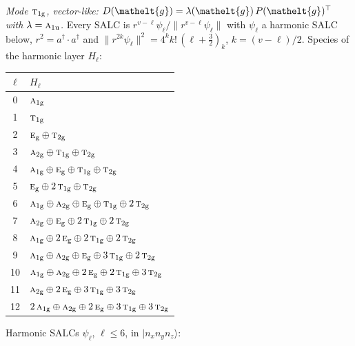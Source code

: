 \documentclass[11pt]{article}
\newcommand{\eltfont}[1]{{\let\sigma\eltsigma\mathelt{#1}}}
\newcommand{\irr}[1]{\text{\normalfont\scshape #1}}
\newcommand{\elt}[1]{\eltfont{#1}}
\newcommand{\ptag}[1]{\mathrm{#1}}
\newcommand{\occ}[1]{\lvert #1\rangle}
\newcommand{\gel}{\elt{g}}             %
\newcommand{\gmat}{P(\gel)^{\top}}     %
\begin{document}
\emph{Mode $\irr{t}_{1\ptag{g}}$, vector-like: $D(\gel)=\lambda(\gel)\,\gmat$ with $\lambda=\irr{a}_{1\ptag{u}}$.} Every SALC is $r^{v-\ell}\psi_\ell/\lVert r^{v-\ell}\psi_\ell\rVert$ with $\psi_\ell$ a harmonic SALC below, $r^2=a^\dagger\!\cdot a^\dagger$ and $\lVert r^{2k}\psi_\ell\rVert^2=4^kk!\,(\ell+\tfrac32)_k$, $k=(v-\ell)/2$. Species of the harmonic layer $H_\ell$:
\begin{longtable}{c l}\hline $\ell$ & $H_\ell$\\ \hline\endhead
0 & $\irr{a}_{1\ptag{g}}$\\
1 & $\irr{t}_{1\ptag{g}}$\\
2 & $\irr{e}_{\ptag{g}}\oplus \irr{t}_{2\ptag{g}}$\\
3 & $\irr{a}_{2\ptag{g}}\oplus \irr{t}_{1\ptag{g}}\oplus \irr{t}_{2\ptag{g}}$\\
4 & $\irr{a}_{1\ptag{g}}\oplus \irr{e}_{\ptag{g}}\oplus \irr{t}_{1\ptag{g}}\oplus \irr{t}_{2\ptag{g}}$\\
5 & $\irr{e}_{\ptag{g}}\oplus 2\,\irr{t}_{1\ptag{g}}\oplus \irr{t}_{2\ptag{g}}$\\
6 & $\irr{a}_{1\ptag{g}}\oplus \irr{a}_{2\ptag{g}}\oplus \irr{e}_{\ptag{g}}\oplus \irr{t}_{1\ptag{g}}\oplus 2\,\irr{t}_{2\ptag{g}}$\\
7 & $\irr{a}_{2\ptag{g}}\oplus \irr{e}_{\ptag{g}}\oplus 2\,\irr{t}_{1\ptag{g}}\oplus 2\,\irr{t}_{2\ptag{g}}$\\
8 & $\irr{a}_{1\ptag{g}}\oplus 2\,\irr{e}_{\ptag{g}}\oplus 2\,\irr{t}_{1\ptag{g}}\oplus 2\,\irr{t}_{2\ptag{g}}$\\
9 & $\irr{a}_{1\ptag{g}}\oplus \irr{a}_{2\ptag{g}}\oplus \irr{e}_{\ptag{g}}\oplus 3\,\irr{t}_{1\ptag{g}}\oplus 2\,\irr{t}_{2\ptag{g}}$\\
10 & $\irr{a}_{1\ptag{g}}\oplus \irr{a}_{2\ptag{g}}\oplus 2\,\irr{e}_{\ptag{g}}\oplus 2\,\irr{t}_{1\ptag{g}}\oplus 3\,\irr{t}_{2\ptag{g}}$\\
11 & $\irr{a}_{2\ptag{g}}\oplus 2\,\irr{e}_{\ptag{g}}\oplus 3\,\irr{t}_{1\ptag{g}}\oplus 3\,\irr{t}_{2\ptag{g}}$\\
12 & $2\,\irr{a}_{1\ptag{g}}\oplus \irr{a}_{2\ptag{g}}\oplus 2\,\irr{e}_{\ptag{g}}\oplus 3\,\irr{t}_{1\ptag{g}}\oplus 3\,\irr{t}_{2\ptag{g}}$\\
\hline\end{longtable}
Harmonic SALCs $\psi_\ell$, $\ell\le6$, in $\occ{n_xn_yn_z}$:
\end{document}
